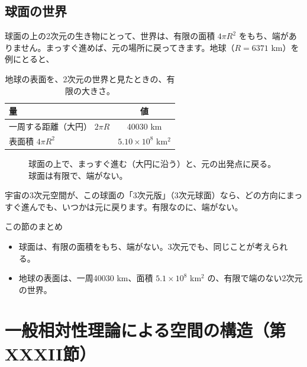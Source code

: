 \documentclass[a4paper,11pt,openany]{ltjsbook}
\begin{document}
\section{球面の世界}

球面の上の2次元の生き物にとって、世界は、有限の面積 $4\pi R^2$ をもち、端がありません。まっすぐ進めば、元の場所に戻ってきます。地球（$R=6371$ km）を例にとると、

\begin{table}[htbp]
\centering
\begin{tabular}{lc}
\toprule
量 & 値\\
\midrule
一周する距離（大円） $2\pi R$ & 40030 km\\
表面積 $4\pi R^2$ & $5.10\times10^{8}$ km$^2$\\
\bottomrule
\end{tabular}
\caption{地球の表面を、2次元の世界と見たときの、有限の大きさ。}
\end{table}

\begin{figure}[htbp]
\centering
{}
\caption{球面の上で、まっすぐ進む（大円に沿う）と、元の出発点に戻る。球面は有限で、端がない。}
\end{figure}

宇宙の3次元空間が、この球面の「3次元版」（3次元球面）なら、どの方向にまっすぐ進んでも、いつかは元に戻ります。有限なのに、端がない。

\begin{pointbox}{この節のまとめ}
\begin{itemize}[leftmargin=*]
\item 球面は、有限の面積をもち、端がない。3次元でも、同じことが考えられる。
\item 地球の表面は、一周40030 km、面積 $5.1\times10^8$ km$^2$ の、有限で端のない2次元の世界。
\end{itemize}
\end{pointbox}

\chapter{一般相対性理論による空間の構造（第XXXII節）}
\end{document}
